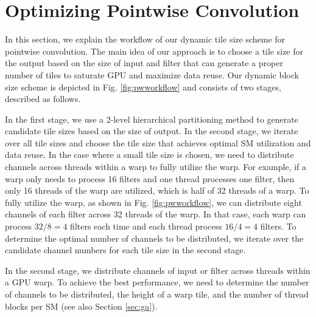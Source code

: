 \section{Optimizing Pointwise Convolution}
\label{sec:pwconv} In this section, we explain the workflow of our dynamic tile size scheme for pointwise convolution.
The main idea of our approach is to choose a tile size for the output based on the size of input and filter that can generate a proper number of tiles to saturate GPU and maximize data reuse.
 Our dynamic block size scheme is
depicted in Fig. \ref{fig:pwworkflow} and consists of two stages, described as follows.

In the first stage, we use a 2-level hierarchical partitioning method to generate candidate tile sizes based on the size of output. In the second stage, we iterate over all tile sizes and choose the tile size that achieves optimal SM utilization and data reuse. In the case where a small tile size is chosen, we need to distribute channels across threads within a warp to fully utilize the warp. For example, if a warp only needs to process 16 filters and one thread processes one filter, then only 16 threads of the warp are utilized, which is half of 32 threads of a warp. To fully utilize the warp, as shown in Fig. \ref{fig:pwworkflow}, we can distribute eight channels of each filter across 32 threads of the warp. In that case, each warp can process $32/8=4$ filters each time and each thread process $16/4=4$ filters. To determine the optimal number of channels to be distributed, we iterate over the candidate channel numbers for each tile size in the second stage.  

 In the second stage, we distribute channels of input or filter across threads
within a GPU warp. To achieve the best performance, we need to determine the number of channels to be distributed, the height of a warp
tile, and the number of thread blocks per SM (see also Section \ref{sec:ga}).

